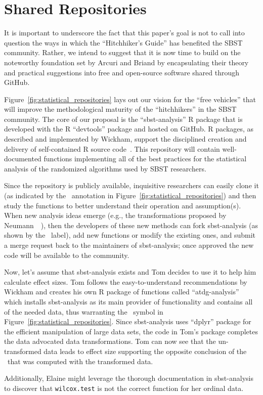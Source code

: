 
\vspace*{-.5em}

\section{Shared Repositories}
\label{sec:repositories}



It is important to underscore the fact that this paper's goal is not to call into question the ways in which the
``Hitchhiker's Guide'' has benefited the SBST community. Rather, we intend to suggest that it is now time to build on
the noteworthy foundation set by Arcuri and Briand by encapsulating their theory and practical suggestions into free and
open-source software shared through GitHub.

Figure~\ref{fig:statistical_repositories} lays out our vision for the ``free vehicles'' that will improve the
methodological maturity of the ``hitchhikers'' in the SBST community. The core of our proposal is the ``sbst-analysis''
R package that is developed with the R ``devtools'' package and hosted on GitHub. R packages, as described and
implemented by Wickham, support the disciplined creation and delivery of self-contained R source
code~\cite{Wickham2015}. This repository will contain well-documented functions implementing all of the best practices
for the statistical analysis of the randomized algorithms used by SBST researchers.

Since the repository is publicly available, inquisitive researchers can easily clone it (as indicated by the
\codecopygit~annotation in Figure~\ref{fig:statistical_repositories}) and then study the functions to better understand
their operation and assumption(s). When new analysis ideas emerge (e.g., the transformations proposed by
Neumann~\etal~\cite{Neumann2015}), then the developers of these new methods can fork sbst-analysis (as shown by the
\codeforkgit~label), add new functions or modify the existing ones, and submit a merge request back to the maintainers
of sbst-analysis; once approved the new code will be available to the community.

Now, let's assume that sbst-analysis exists and Tom decides to use it to help him calculate effect sizes. Tom follows
the easy-to-understand recommendations by Wickham and creates his own R package of functions called ``atdg-analysis''
which installs sbst-analysis as its main provider of functionality and contains all of the needed data, thus warranting
the \codedatagit~symbol in Figure~\ref{fig:statistical_repositories}. Since sbst-analysis uses ``dplyr'' package for the
efficient manipulation of large data sets, the code in Tom's package completes the data advocated data transformations.
Tom can now see that the un-transformed data leads to effect size supporting the opposite conclusion of the
\atwelve~that was computed with the transformed data.

Additionally, Elaine might leverage the thorough documentation in sbst-analysis to discover that {\tt wilcox.test} is
not the correct function for her ordinal data.

